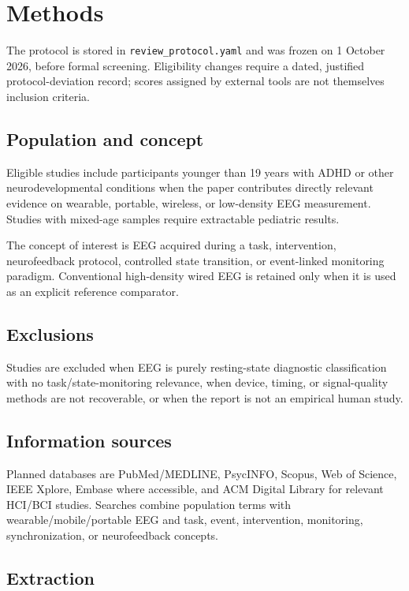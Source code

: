 \section{Methods}

The protocol is stored in \texttt{review\_protocol.yaml} and was frozen on 1 October 2026, before formal screening. Eligibility changes require a dated, justified protocol-deviation record; scores assigned by external tools are not themselves inclusion criteria.

\subsection{Population and concept}

Eligible studies include participants younger than 19 years with ADHD or other neurodevelopmental conditions when the paper contributes directly relevant evidence on wearable, portable, wireless, or low-density EEG measurement. Studies with mixed-age samples require extractable pediatric results.

The concept of interest is EEG acquired during a task, intervention, neurofeedback protocol, controlled state transition, or event-linked monitoring paradigm. Conventional high-density wired EEG is retained only when it is used as an explicit reference comparator.

\subsection{Exclusions}

Studies are excluded when EEG is purely resting-state diagnostic classification with no task/state-monitoring relevance, when device, timing, or signal-quality methods are not recoverable, or when the report is not an empirical human study.

\subsection{Information sources}

Planned databases are PubMed/MEDLINE, PsycINFO, Scopus, Web of Science, IEEE Xplore, Embase where accessible, and ACM Digital Library for relevant HCI/BCI studies. Searches combine population terms with wearable/mobile/portable EEG and task, event, intervention, monitoring, synchronization, or neurofeedback concepts.

\subsection{Extraction}

